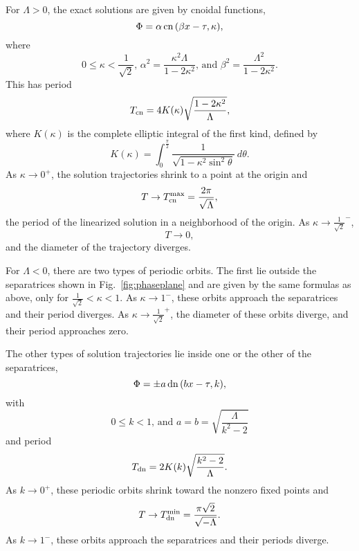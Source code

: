 \documentclass{article}
\numberwithin{equation}{section}
\numberwithin{figure}{section}
\begin{document}
For $\Lambda>0$, the exact solutions are given by cnoidal functions,
\begin{equation}
\Phi = \alpha \operatorname{cn}{(\beta x- \tau,\kappa)},
\label{cn}
\end{equation}
where 
\[
0 \le \kappa < \frac{1}{\sqrt{2}}, \,
\alpha^2 = \frac{\kappa^2 \Lambda}{1-2\kappa^2}, \, \text{and }
\beta^2 = \frac{\Lambda^2}{1-2\kappa^2}.
\]
This has period 
\begin{equation}
T_{\rm cn} = 4 K(\kappa) \sqrt{\frac{1-2\kappa^2}{\Lambda}},
\label{Tcn}
\end{equation}
where $K(\kappa)$ is the complete elliptic integral of the first kind, defined by
$$
K(\kappa) = \int_0^{\frac{\pi}{2}} \frac{1}{\sqrt{1-\kappa^2 \sin^2{\theta}}} \ d\theta.
$$
As $\kappa \to 0^+$, the solution trajectories shrink to a point at the origin and
\begin{equation}
T \to T_{\rm cn}^{\rm max} = \frac{2\pi}{\sqrt{\Lambda}},
\label{Tcnmax}
\end{equation}
the period of the linearized solution in a neighborhood of the origin. 
As $\kappa \to {\frac{1}{\sqrt{2}}}^-$, 
\[
T \to 0,
\]
and the diameter of the trajectory diverges.

For $\Lambda<0$, there are two types of periodic orbits. The first lie outside the separatrices shown in Fig.~\ref{fig:phaseplane} and are given by the same formulas as above, only for $\frac{1}{\sqrt{2}}  < \kappa < 1$. As $\kappa \to 1^-$, these orbits approach the separatrices and their period diverges. As $\kappa \to {\frac{1}{\sqrt{2}}}^+$, the diameter of these orbits diverge, and their period approaches zero.

The other types of solution trajectories lie inside one or the other of the separatrices,
\begin{equation}
\Phi = \pm a \operatorname{dn}{(bx-\tau,k)},
\label{dn}
\end{equation}
with 
\[
0\le k < 1, \, \text{and }
a = b = \sqrt{\frac{\Lambda}{k^2-2}}
\]
and period 
\begin{equation}
T_{\rm dn} = 2K(k)\sqrt{\frac{k^2-2}{\Lambda}}.
\label{Tdn}
\end{equation}
As $k \to 0^+$, these periodic orbits shrink toward the nonzero fixed points and 
\begin{equation}
T \to T_{\rm dn}^{\rm min} =\frac{\pi \sqrt{2}}{\sqrt{-\Lambda}}.
\label{Tdnmin}
\end{equation}
As $k \to 1^-$, these orbits approach the separatrices and their periods diverge.




\end{document}
